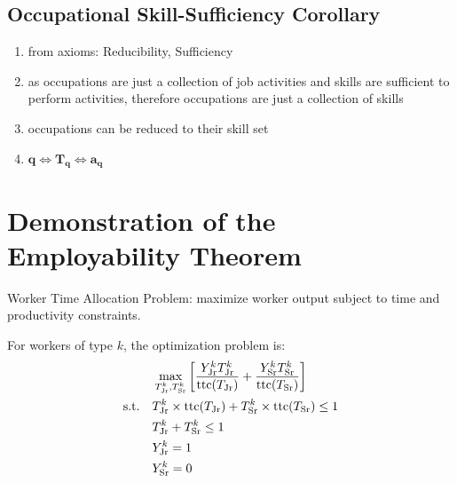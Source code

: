 \documentclass{elsarticle} %
\begin{document}
\subsection{Occupational Skill-Sufficiency Corollary}
\begin{enumerate}
    \item from axioms: Reducibility, Sufficiency
    \item as occupations are just a collection of job activities and skills are
          sufficient to perform activities, therefore occupations are just a collection
          of skills
    \item occupations can be reduced to their skill set
    \item $\boldsymbol{q} \iff \boldsymbol{T_q} \iff \boldsymbol{a_q}$
\end{enumerate}


\section{Demonstration of the Employability Theorem}
Worker Time Allocation Problem: maximize worker output subject to time and productivity constraints.

For workers of type $k$, the optimization problem is: 
\begin{gather*}
    \max_{
        T_{\text{Jr}}^{k},
        T_{\text{Sr}}^{k}
    }{%
        \left[
            \frac{
                Y_{\text{Jr}}^{k}
                T_{\text{Jr}}^{k}
            }{
                \text{ttc}(T_{\text{Jr}})
            } + 
            \frac{
                Y_{\text{Sr}}^{k}
                T_{\text{Sr}}^{k}
            }{
                \text{ttc}(T_{\text{Sr}})
            }
        \right]
    }\\
    \begin{align*}
        \text{s.t.} \quad
        & T_{\text{Jr}}^{k} \times \text{ttc}(T_{\text{Jr}}) +
        T_{\text{Sr}}^{k} \times \text{ttc}(T_{\text{Sr}}) 
        \leq 1
        \\
        & T_{\text{Jr}}^{k} + T_{\text{Sr}}^{k} \leq 1
        \\
        & Y_{\text{Jr}}^{k} = 1
        \\
        & Y_{\text{Sr}}^{k} = 0
    \end{align*}
\end{gather*}
\end{document}
